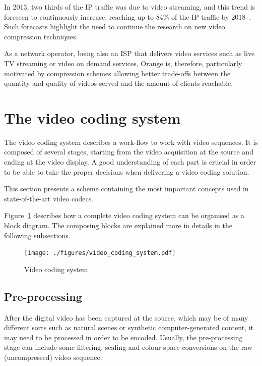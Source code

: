 \documentclass[11pt,a4paper,openright,twoside]{book}
\numberwithin{equation}{section} %
\numberwithin{figure}{section} %
\numberwithin{table}{section} %
\begin{document}
In 2013, two thirds of the \ac{IP} traffic was due to video
streaming, and this trend is foreseen to continuously increase, reaching up to
84\% of the \acs{IP} traffic by 2018~\cite{cisco-13-vni-forecast}.
Such forecasts highlight the need to continue the research on new video
compression techniques.

As a network operator, being also an \ac{ISP} that delivers video services
such as live TV streaming or video on demand services, Orange is, therefore,
particularly motivated by compression schemes allowing better trade-offs
between the quantity and quality of videos served and the amount of clients
reachable.

\section{The video coding system}
\label{sec:the_video_coding_system}

The video coding system describes a work-flow to work with video
sequences.
It is composed of several stages, starting from the video acquisition at
the source and ending at the video display.
A good understanding of each part is crucial in order to be able to take the
proper decisions when delivering a video coding solution.

This section presents a scheme containing the most important concepts
used in state-of-the-art video codecs.

Figure~\ref{fig:video_coding_system} describes how a complete video coding
system can be organised as a block diagram.
The composing blocks are explained more in details in the following
subsections.

\begin{figure}[tb]
	\centering
	\texttt{[image: ./figures/video\_coding\_system.pdf]}
	\caption{Video coding system}
	\label{fig:video_coding_system}
\end{figure}

\subsection{Pre-processing}
\label{sub:pre_processing}

After the digital video has been captured at the source, which may be of many
different sorts such as natural scenes or synthetic computer-generated
content, it may need to be processed in order to be encoded.
Usually, the pre-processing stage can include some filtering, scaling and
colour space conversions on the raw (uncompressed) video sequence.
\end{document}
